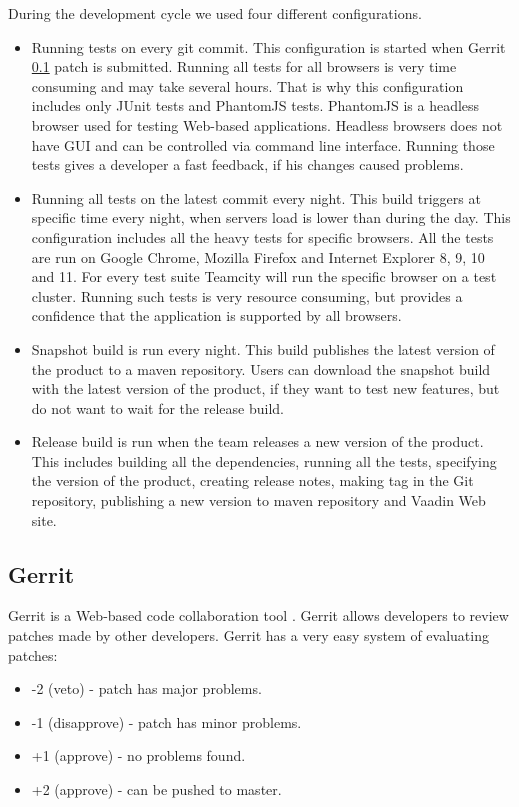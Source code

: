   During the development cycle we used four different configurations.
  \begin{itemize}
  \item Running tests on every git commit. This configuration is started when
  Gerrit \ref{sec:gerrit} patch is submitted.
   Running all tests for all browsers is very time consuming and may take several hours. 
   That is why this configuration includes only JUnit tests and PhantomJS
   \cite{phanotmSite} tests. PhantomJS is a headless browser used for testing Web-based applications.
   Headless browsers does not have GUI and can be controlled via command line
   interface. Running those tests gives a developer a fast feedback, if his changes caused problems.
   
   \item Running all tests on the latest commit every night. This build triggers
   at specific time every night, when servers load is lower than during the day.
    This configuration includes all the heavy tests for specific browsers. All
    the tests are run on Google Chrome, Mozilla Firefox and Internet Explorer 8, 9, 10 and 11. 
    For every test suite Teamcity will run the specific browser on a test
    cluster. Running such tests is very resource consuming, but provides a
    confidence that the application is supported by all browsers.
    
    \item Snapshot build is run every night. This build publishes the latest
    version of the product to a maven repository.  Users can download
    the snapshot build with the latest version of the product, if they want to
    test new features, but do not want to wait for the release build.
    
    \item Release build is run when the team releases a new version of the
    product. This includes building all the dependencies, running all the tests,
    specifying the version of the product, creating release notes, making tag in
    the Git repository, publishing a new version to maven repository and Vaadin
    Web site.
   \end{itemize}

\subsection{Gerrit}
\label{sec:gerrit}
  Gerrit is a Web-based code collaboration tool \cite{gerrit}. Gerrit allows
  developers to review patches made by other developers.
   Gerrit has a very easy system of evaluating patches:
  \begin{itemize}
  \item -2 (veto) - patch has major problems.
  \item -1 (disapprove) - patch has minor problems.
  \item +1 (approve) - no problems found.
  \item +2 (approve) - can be pushed to master.
  \end{itemize}
  
